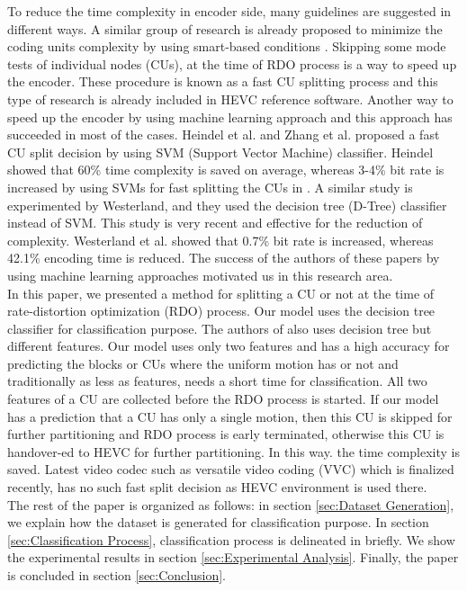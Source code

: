 \documentclass{article}
\begin{document}
To reduce the time complexity in encoder side, many guidelines are suggested in different ways. A similar group of research is already proposed to minimize the coding units complexity by using smart-based conditions \cite{vanne2014efficient,heindel2015fast}. Skipping some mode tests of individual nodes (CUs), at the time of RDO process is a way to speed up the encoder. These procedure is known as a fast CU splitting process and this type of research \cite{choi2011coding, gweon2012early, yang2011early} is already included in HEVC reference software. Another way to speed up the encoder by using machine learning approach and this approach has succeeded in most of the cases. Heindel et al. \cite{heindel2016fast} and Zhang et al. \cite{zhang2015machine} proposed a fast CU split decision by using SVM (Support Vector Machine) classifier. Heindel showed that 60\% time complexity is saved on average, whereas 3-4\% bit rate is increased by using SVMs for fast splitting the CUs in \cite{heindel2016fast}. A similar study is experimented by Westerland, and they used the decision tree (D-Tree) classifier instead of SVM. This study is very recent and effective for the reduction of complexity. Westerland et al. \cite{westland2019decision} showed that 0.7\% bit rate is increased, whereas 42.1\% encoding time is reduced. The success of the authors of these papers by using machine learning approaches motivated us in this research area. \\

In this paper, we presented a method for splitting a CU or not at the time of rate-distortion optimization (RDO) process. Our model uses the decision tree classifier for classification purpose. The authors of \cite{westland2019decision} also uses decision tree but different features. Our model uses only two features and has a high accuracy for predicting the blocks or CUs where the uniform motion has or not and traditionally as less as features, needs a short time for classification. All two features of a CU are collected before the RDO process is started. If our model has a prediction that a CU has only a single motion, then this CU is skipped for further partitioning and RDO process is early terminated, otherwise this CU is handover-ed to HEVC for further partitioning. In this way. the time complexity is saved. Latest video codec such as versatile video coding (VVC) which is finalized recently, has no such fast split decision as HEVC environment is used there.\\ 

\vspace{-4mm}
The rest of the paper is organized as follows: in section \ref{sec:Dataset Generation}, we explain how the dataset is generated for classification purpose. In section \ref{sec:Classification Process}, classification process is delineated in briefly. We show the experimental results in section \ref{sec:Experimental Analysis}. Finally, the paper is concluded in section \ref{sec:Conclusion}.
\end{document}
